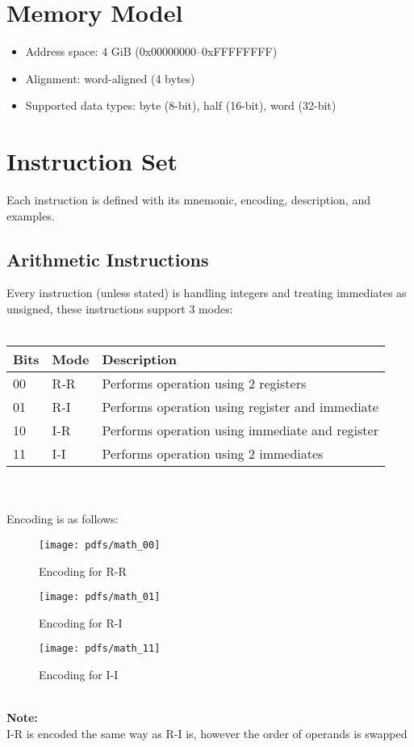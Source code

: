 \documentclass[a4paper,12pt]{article}
\begin{document}
\newpage
\section{Memory Model}
\begin{itemize}
  \item Address space: 4 GiB (0x00000000--0xFFFFFFFF)
  \item Alignment: word-aligned (4 bytes)
  \item Supported data types: byte (8-bit), half (16-bit), word (32-bit)
\end{itemize}

\newpage
\section{Instruction Set}
Each instruction is defined with its mnemonic, encoding, description, and examples.

\subsection{Arithmetic Instructions}
Every instruction (unless stated) is handling integers and treating immediates as unsigned,
these instructions support 3 modes:\\
\\
\begin{tabular}{@{}lll@{}}
\toprule
Bits & Mode & Description \\
\midrule
00 & R-R & Performs operation using 2 registers \\
01 & R-I & Performs operation using register and immediate \\
10 & I-R & Performs operation using immediate and register \\
11 & I-I & Performs operation using 2 immediates \\
\bottomrule
\end{tabular}
\\
\\
Encoding is as follows:\\
\begin{figure}[h]
    \centering
    \texttt{[image: pdfs/math\_00]}
    \caption{Encoding for R-R}
\end{figure}
\begin{figure}[h]
    \centering
    \texttt{[image: pdfs/math\_01]}
    \caption{Encoding for R-I}
\end{figure}
\begin{figure}[h]
    \centering
    \texttt{[image: pdfs/math\_11]}
    \caption{Encoding for I-I}
\end{figure}
\\
\textbf{Note:}\\
I-R is encoded the same way as R-I is, however the order of operands is
swapped
\end{document}
